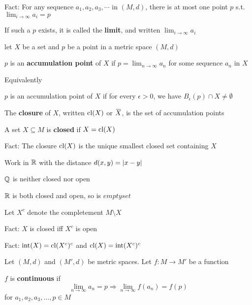 \documentclass[11pt]{article}
\def \tint {\text{int}}
\begin{document}
Fact: For any sequence \(a_1,a_2,a_3,\cdots\) in \((M,d)\), there is at most one point \(p\)
s.t. \(\lim_{i\to\infty}a_i=p\)

If such a \(p\) exists, it is called the \textbf{limit}, and written \(\lim_{i\to\infty}a_i\)

let \(X\) be a set and \(p\) be a point in a metric space \((M,d)\)

\begin{definition}[]
\(p\) is an \textbf{accumulation point} of \(X\) if \(p=\lim_{n\to\infty}a_n\) for some sequence \(a_n\) in \(X\)
\end{definition}

Equivalently
\begin{definition}[]
\(p\) is an accumulation point of \(X\) if for every \(\epsilon>0\), we have \(B_\epsilon(p)\cap X\neq\emptyset\)
\end{definition}

\begin{definition}[]
The \textbf{closure} of \(X\), written \(\operatorname{\text{cl}}(X)\) or \(\barX\), is the set of accumulation points
\end{definition}

\begin{definition}[]
A set \(X\subseteq M\) is \textbf{closed} if \(X=\operatorname{\text{cl}}(X)\)
\end{definition}


Fact: The closure \(\operatorname{\text{cl}}(X)\) is the unique smallest closed set containing \(X\)

\begin{examplle}[]
Work in \(\mathbb{R}\) with the distance \(d(x,y)=\abs{x-y}\)

\(\mathbb{Q}\) is neither closed nor open

\(\mathbb{R}\) is both closed and open, so is \(emptyset\)
\end{examplle}

Let \(X^c\) denote the completement \(M\setminus X\)

Fact: \(X\) is closed iff \(X^c\) is open

Fact: \(\tint(X)=\cl(X^c)^c\) and \(\cl(X)=\tint(X^c)^c\)

Let \((M,d)\) and \((M',d)\) be metric spaces. Let \(f:M\to M'\) be a function
\begin{definition}[]
\(f\) is \textbf{continuous} if
\begin{equation*}
\lim_{n\to\infty}a_n=p\Rightarrow\lim_{n\to\infty}f(a_n)=f(p)
\end{equation*}
for \(a_1,a_2,a_3,\dots,p\in M\)
\end{definition}
\end{document}
